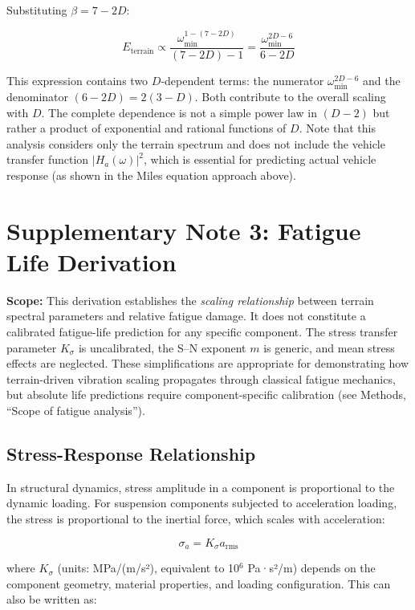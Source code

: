 \documentclass[11pt]{article}
\begin{document}
Substituting $\beta = 7-2D$:

\begin{equation}
E_{\text{terrain}} \propto \frac{\omega_{\min}^{1-(7-2D)}}{(7-2D)-1} = \frac{\omega_{\min}^{2D-6}}{6-2D}
\end{equation}

This expression contains two $D$-dependent terms: the numerator $\omega_{\min}^{2D-6}$ and the denominator $(6-2D) = 2(3-D)$. Both contribute to the overall scaling with $D$. The complete dependence is not a simple power law in $(D-2)$ but rather a product of exponential and rational functions of $D$. Note that this analysis considers only the terrain spectrum and does not include the vehicle transfer function $|H_a(\omega)|^2$, which is essential for predicting actual vehicle response (as shown in the Miles equation approach above).

\section{Supplementary Note 3: Fatigue Life Derivation}

\textbf{Scope:} This derivation establishes the \emph{scaling relationship} between terrain spectral parameters and relative fatigue damage. It does not constitute a calibrated fatigue-life prediction for any specific component. The stress transfer parameter $K_\sigma$ is uncalibrated, the S--N exponent $m$ is generic, and mean stress effects are neglected. These simplifications are appropriate for demonstrating how terrain-driven vibration scaling propagates through classical fatigue mechanics, but absolute life predictions require component-specific calibration (see Methods, ``Scope of fatigue analysis'').

\subsection{Stress-Response Relationship}

In structural dynamics, stress amplitude in a component is proportional to the dynamic loading. For suspension components subjected to acceleration loading, the stress is proportional to the inertial force, which scales with acceleration:

\begin{equation}
\sigma_a = K_\sigma a_{\text{rms}}
\end{equation}

where $K_\sigma$ (units: MPa/(m/s²), equivalent to 10$^6$ Pa·s²/m) depends on the component geometry, material properties, and loading configuration. This can also be written as:
\end{document}
